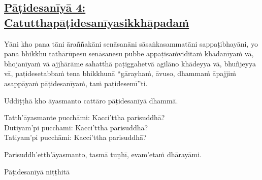 \subsection*{\hyperref[ack4]{Pāṭidesanīyā 4: Catutthapāṭidesanīyasikkhāpadaṁ}}
\label{pd4}
Yāni kho pana tāni āraññakāni senāsanāni sāsaṅkasammatāni sappaṭibhayāni, yo pana bhikkhu tathārūpesu senāsanesu pubbe appaṭisaṁviditaṁ khādanīyaṁ vā, bhojanīyaṁ vā ajjhārāme sahatthā paṭiggahetvā agilāno khādeyya vā, bhuñjeyya vā, paṭidesetabbaṁ tena bhikkhunā “gārayhaṁ, āvuso, dhammaṁ āpajjiṁ asappāyaṁ pāṭidesanīyaṁ, taṁ paṭidesemī”ti.

\medskip

\begin{center}
Uddiṭṭhā kho āyasmanto cattāro pāṭidesanīyā dhammā.

\smallskip

Tatth'āyasmante pucchāmi: Kacci'ttha parisuddhā?\\
Dutiyam'pi pucchāmi: Kacci'ttha parisuddhā?\\
Tatiyam'pi pucchāmi: Kacci'ttha parisuddhā?

\smallskip

Parisuddh'etth'āyasmanto, tasmā tuṇhī, evam'etaṁ dhārayāmi.
\end{center}

\begin{outro}
  Pāṭidesanīyā niṭṭhitā
\end{outro}

\clearpage
